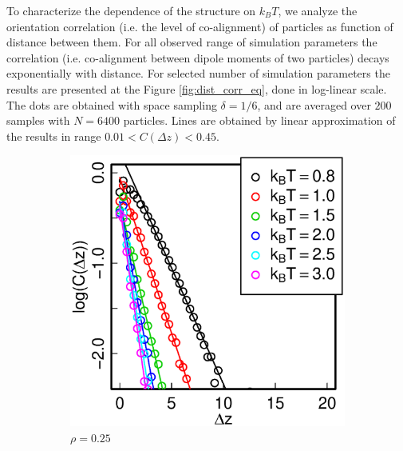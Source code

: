 To characterize the dependence of the structure on $k_BT$, we analyze the orientation correlation (i.e. the level of co-alignment) of particles as function of distance between them. For all observed range of simulation parameters the correlation (i.e. co-alignment between dipole moments of two particles) decays exponentially with distance. For selected number of simulation parameters the results are presented at the Figure \ref{fig:dist_corr_eq}, done in log-linear scale. The dots are obtained with space sampling $\delta = 1/6$, and are averaged over $200$ samples with $N = 6400$ particles. Lines are obtained by linear approximation of the results in range $0.01 < C(\Delta z) < 0.45$.
\begin{figure}[h]
\centering
\begin{subfigure}[t]{0.32\textwidth}
	\centering
	\includegraphics[width=\textwidth]{Images/distCor_25}
	\caption{$\rho = 0.25$}
\end{subfigure}
\begin{subfigure}[t]{0.32\textwidth}
	\centering

\end{subfigure}
\end{figure}
